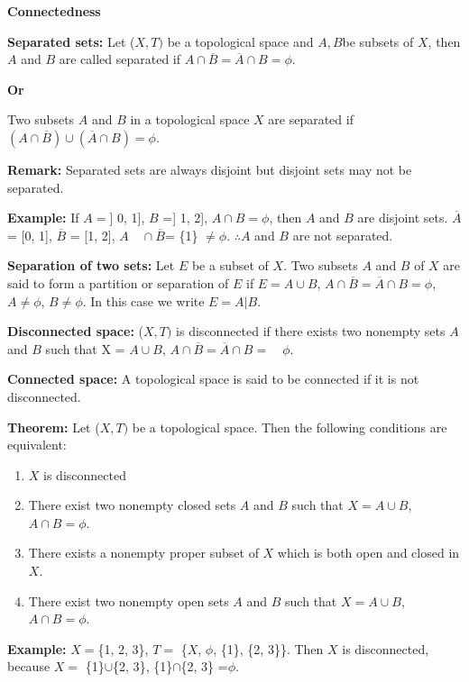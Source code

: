 \documentclass[12pt]{amsart}
\begin{document}
\textbf{Connectedness}

\textbf{Separated sets:} Let ($X, T)$ be a topological space and $A, B $be subsets of 
$X$, then $A$ and $B$ are called separated if $A\cap \overline B =\overline A \cap 
B=\phi $. 

\textbf{Or }

Two subsets $A$ and $B$ in a topological space $X$ are separated if$(A\cap \overline 
B )\cup (\overline A \cap B)=\phi $.

\textbf{Remark:} Separated sets are always disjoint but disjoint sets may 
not be separated.

\textbf{Example:} If $A =$] 0, 1], $B$ =] 1, 2], $A\cap B=\phi $, then $A$ and $B$ are 
disjoint sets. $\overline A $= [0, 1], $\overline B $ = [1, 2], $A \quad \cap 
\overline B $= {\{}1{\}} $\ne \phi $. $\therefore A$ and $B$ are not 
separated.

\textbf{Separation of two sets:} Let $E$ be a subset of $X$. Two subsets $A$ and $B$ of 
$X$ are said to form a partition or separation of $E$ if $E = A\cup B$, $A\cap \overline 
B =\overline A \cap B=\phi $, $A\ne \phi $, $B\ne \phi $. In this 
case we write $E = A\vert B$.

\textbf{Disconnected space:} ($X, T)$ is disconnected if there exists two nonempty 
sets $A$ and $B$ such that X = $A\cup B$, $A\cap \overline B =\overline A \cap 
B = \quad \phi $.

\textbf{Connected space:} A topological space is said to be connected if it 
is not disconnected.

\textbf{Theorem:} Let ($X, T)$ be a topological space. Then the following 
conditions are equivalent:

\begin{enumerate}
\item $X$ is disconnected
\item There exist two nonempty closed sets $A$ and $B$ such that $X = A\cup B$, $A\cap B =\phi $.
\item There exists a nonempty proper subset of $X$ which is both open and closed in $X$.
\item There exist two nonempty open sets $A$ and $B$ such that $X = A\cup B$, $A\cap B =\phi $.
\end{enumerate}

\textbf{Example:} $X = ${\{}1, 2, 3{\}}, $T =$ {\{}$X$, $\phi $, {\{}1{\}}, {\{}2, 
3{\}}{\}}. Then $X$ is disconnected, because $X =$ {\{}1{\}}$\cup ${\{}2, 3{\}}, 
{\{}1{\}}$\cap ${\{}2, 3{\}} =$\phi $. 
\end{document}
